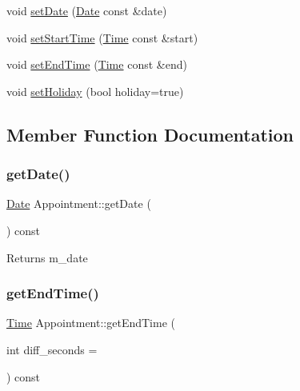 \begin{DoxyCompactItemize}
\item 
void \hyperlink{classAppointment_a0a69e652f7d3fa5091330a92479749a6}{set\+Date} (\hyperlink{classDate}{Date} const \&date)
\item 
void \hyperlink{classAppointment_ae0e33915a3e3d3af95c7e6180809e5fe}{set\+Start\+Time} (\hyperlink{classTime}{Time} const \&start)
\item 
void \hyperlink{classAppointment_a9e6455381eebacbaa3aa98ad3707baac}{set\+End\+Time} (\hyperlink{classTime}{Time} const \&end)
\item 
void \hyperlink{classAppointment_acd825ab9b1d23efe1bc95dd440030094}{set\+Holiday} (bool holiday=true)
\end{DoxyCompactItemize}


\subsection{Member Function Documentation}
\mbox{\label{classAppointment_ac4f82720deaa4daf6679d1c60fadfb67}} 
\subsubsection{\texorpdfstring{get\+Date()}{getDate()}}
{\footnotesize\ttfamily \hyperlink{classDate}{Date} Appointment\+::get\+Date (\begin{DoxyParamCaption}{ }\end{DoxyParamCaption}) const}

\begin{DoxyReturn}{Returns}
m\+\_\+date 
\end{DoxyReturn}
\mbox{\label{classAppointment_a5ba3b128ad963c9676af3fb199b98613}} 
\subsubsection{\texorpdfstring{get\+End\+Time()}{getEndTime()}}
{\footnotesize\ttfamily \hyperlink{classTime}{Time} Appointment\+::get\+End\+Time (\begin{DoxyParamCaption}\item[{int}]{diff\+\_\+seconds = {} }\end{DoxyParamCaption}) const}


